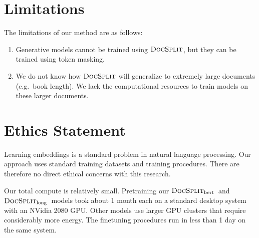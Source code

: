 \documentclass[11pt]{article}
\newcommand{\our}{\mbox{\textsc{DocSplit}}}
\newcommand{\ourbert}{$\our_{\mathrm{bert}}$}
\newcommand{\ourlong}{$\our_{\mathrm{long}}$}
\begin{document}
\section*{Limitations}
The limitations of our method are as follows:
\begin{enumerate}[nosep,leftmargin=*]
    \item Generative models cannot be trained using $\our$, but they can be trained using token masking.
    \item We do not know how $\our$ will generalize to extremely large documents (e.g.\ book length).
        We lack the computational resources to train models on these larger documents.
\end{enumerate}

\section*{Ethics Statement}

Learning embeddings is a standard problem in natural language processing.
Our approach uses standard training datasets and training procedures.
There are therefore no direct ethical concerns with this research.

Our total compute is relatively small.
Pretraining our \ourbert~and \ourlong~models took about 1 month each on a standard desktop system with an NVidia 2080 GPU.
Other models use larger GPU clusters that require considerably more energy.
The finetuning procedures run in less than 1 day on the same system.





\end{document}
